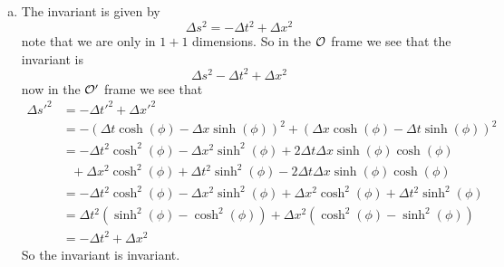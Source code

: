 \documentclass[11pt]{article}
\numberwithin{equation}{section}
\begin{document}
\begin{enumerate}[(a)]
\item
The invariant is given by
$$\Delta s^2 = -\Delta t^2 + \Delta x^2$$
note that we are only in $1+1$ dimensions. So in the $\mathcal{O}$ frame we see that the invariant is
$$\Delta s^2 -\Delta t^2 + \Delta x^2$$
now in the $\mathcal{O}'$ frame we see that
\begin{align*}
\Delta s'^2 &= -\Delta t'^2 + \Delta x'^2\\
&= -(\Delta t\cosh(\phi) - \Delta x\sinh(\phi))^2 + (\Delta x\cosh(\phi) - \Delta t\sinh(\phi))^2\\
&= -\Delta t^2\cosh^2(\phi) - \Delta x^2\sinh^2(\phi) +2\Delta t\Delta x\sinh(\phi)\cosh(\phi) \\
&\ \ \ + \Delta x^2\cosh^2(\phi) + \Delta t^2\sinh^2(\phi) - 2\Delta t\Delta x\sinh(\phi)\cosh(\phi)\\
&= -\Delta t^2\cosh^2(\phi) - \Delta x^2\sinh^2(\phi) +   \Delta x^2\cosh^2(\phi) + \Delta t^2\sinh^2(\phi) \\
&= \Delta t^2(\sinh^2(\phi) - \cosh^2(\phi)) + \Delta x^2(\cosh^2(\phi) - \sinh^2(\phi)) \\
&= -\Delta t^2 + \Delta x^2
\end{align*}
So the invariant is invariant.
\end{enumerate}
\end{document}
